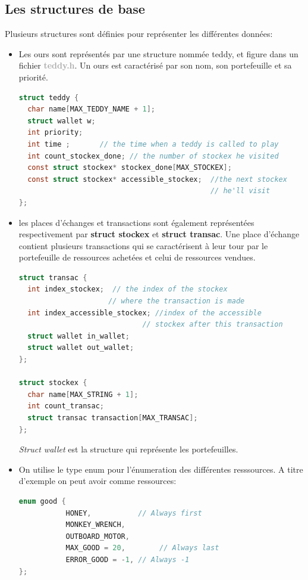 \documentclass[a4paper,12pt]{article}
\begin{document}
 \subsection{Les structures de base}
Plusieurs structures sont définies pour représenter les différentes données:
\begin{itemize}
\item Les ours sont représentés par une structure nommée teddy, et figure dans un
fichier \textcolor{darkgray}{\textbf{teddy.h}}. Un ours est caractérisé par son nom, son portefeuille et sa priorité.
\begin{lstlisting}[language={C},captionpos=b, frame=single, caption = Structure Teddy]
struct teddy {
  char name[MAX_TEDDY_NAME + 1]; 
  struct wallet w;  
  int priority;
  int time ;       // the time when a teddy is called to play
  int count_stockex_done; // the number of stockex he visited
  const struct stockex* stockex_done[MAX_STOCKEX];
  const struct stockex* accessible_stockex;  //the next stockex
                                             // he'll visit
};
\end{lstlisting}

\item les places d'échanges et transactions sont également représentées respectivement par \textbf{struct stockex} et \textbf{struct transac}. Une place d'échange contient plusieurs transactions qui se caractérisent à leur tour par le portefeuille de ressources achetées et celui de ressources vendues. 
\begin{lstlisting}[language={C},captionpos=b, frame=single, caption= Structures transac et stockex]
struct transac {
  int index_stockex;  // the index of the stockex 
                     // where the transaction is made
  int index_accessible_stockex; //index of the accessible
                             // stockex after this transaction
  struct wallet in_wallet; 
  struct wallet out_wallet; 
};

struct stockex {
  char name[MAX_STRING + 1];
  int count_transac;       
  struct transac transaction[MAX_TRANSAC];
};
\end{lstlisting}
\emph{Struct wallet} est la structure qui représente les portefeuilles.

\item On utilise le type enum pour l'énumeration des différentes resssources. A titre d'exemple on peut avoir comme ressources:
\begin{lstlisting}[language={C},captionpos=b, frame=single, caption = Enumération des ressources]
enum good {
           HONEY,           // Always first
           MONKEY_WRENCH,
           OUTBOARD_MOTOR,
           MAX_GOOD = 20,        // Always last
           ERROR_GOOD = -1, // Always -1
};
\end{lstlisting}


\end{itemize}
\end{document}
